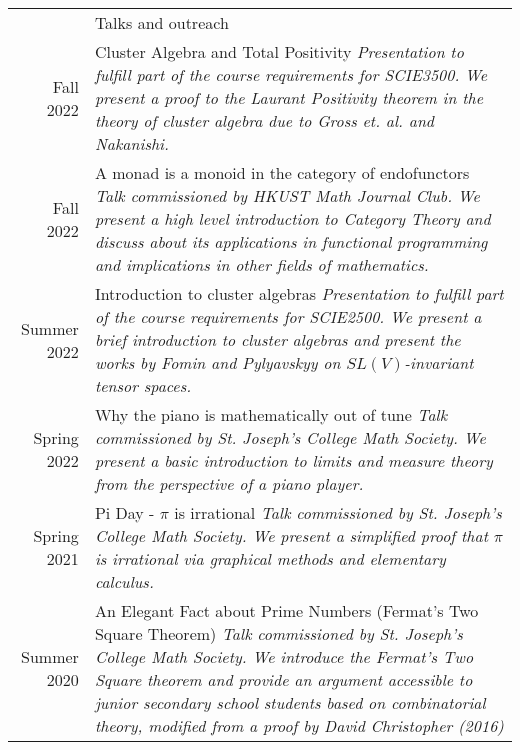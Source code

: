 \documentclass[letterpaper, 11pt]{article}
\newcommand{\headingfont}{\Large\color{OliveGreen}}
\newenvironment{SectionTable}[1]{
	\renewcommand*{\arraystretch}{1.7}
	\setlength{\tabcolsep}{10pt}
	\begin{longtable}{Rp{5.2in}} & #1 \\}
{\end{longtable}\vspace{-.3cm}}
\begin{document}
\begin{SectionTable}{\headingfont Talks and outreach}
Fall 2022 &
Cluster Algebra and Total Positivity
 \newline
\textit{Presentation to fulfill part of the course requirements for SCIE3500. We present a proof to the Laurant Positivity theorem in the theory of cluster algebra due to Gross et. al. and Nakanishi.} \\
Fall 2022 &
A monad is a monoid in the category of endofunctors
 \newline
\textit{Talk commissioned by HKUST Math Journal Club. We present a high level introduction to Category Theory and discuss about its applications in functional programming and implications in other fields of mathematics.} \\
Summer 2022 &
Introduction to cluster algebras
 \newline
\textit{Presentation to fulfill part of the course requirements for SCIE2500. We present a brief introduction to cluster algebras and present the works by Fomin and Pylyavskyy on \(SL(V)\)-invariant tensor spaces.} \\
Spring 2022 &
Why the piano is mathematically out of tune
\newline
\textit{Talk commissioned by St. Joseph's College Math Society. We present a basic introduction to limits and measure theory from the perspective of a piano player.} \\
Spring 2021 &
Pi Day - \(\pi\) is irrational \newline
\textit{Talk commissioned by St. Joseph's College Math Society. We present a simplified proof that \(\pi\) is irrational via graphical methods and elementary calculus.} \\
Summer 2020 &
An Elegant Fact about Prime Numbers (Fermat's Two Square Theorem) \newline
\textit{Talk commissioned by St. Joseph's College Math Society. We introduce the Fermat's Two Square theorem and provide an argument accessible to junior secondary school students based on combinatorial theory, modified from a proof by David Christopher (2016)} \\
\end{SectionTable}
\end{document}
